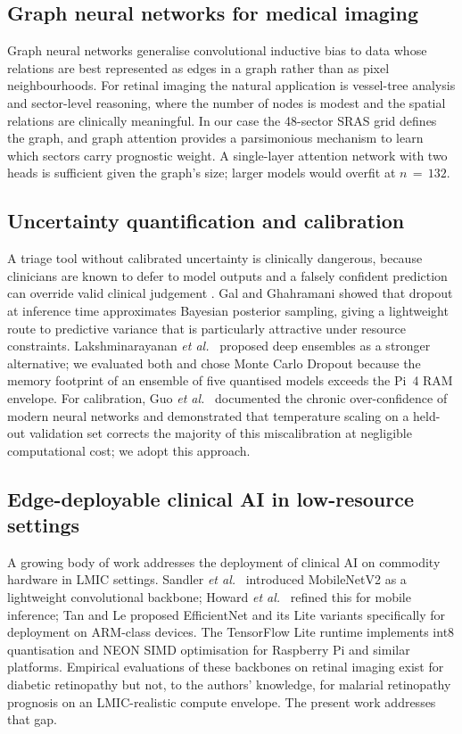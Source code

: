 \documentclass[twocolumn,10pt]{article}
\begin{document}
\subsection{Graph neural networks for medical imaging}
Graph neural networks \cite{Velickovic2018,Kipf2017GCN}
generalise convolutional inductive bias to data whose relations
are best represented as edges in a graph rather than as pixel
neighbourhoods. For retinal imaging the natural application is
vessel-tree analysis and sector-level reasoning, where the number
of nodes is modest and the spatial relations are clinically
meaningful. In our case the 48-sector SRAS grid defines the graph,
and graph attention \cite{Velickovic2018} provides a parsimonious
mechanism to learn which sectors carry prognostic weight. A
single-layer attention network with two heads is sufficient given
the graph's size; larger models would overfit at
$n\,=\,132$.

\subsection{Uncertainty quantification and calibration}
A triage tool without calibrated uncertainty is clinically
dangerous, because clinicians are known to defer to model outputs
and a falsely confident prediction can override valid clinical
judgement \cite{CabitzaRasoini2017}. Gal and Ghahramani
\cite{Gal2016} showed that dropout at inference time approximates
Bayesian posterior sampling, giving a lightweight route to
predictive variance that is particularly attractive under
resource constraints. Lakshminarayanan \emph{et al.}\
\cite{Lakshminarayanan2017DeepEnsembles} proposed deep ensembles
as a stronger alternative; we evaluated both and chose Monte Carlo
Dropout because the memory footprint of an ensemble of five
quantised models exceeds the Pi~4 RAM envelope. For calibration,
Guo \emph{et al.}\ \cite{Guo2017Calibration} documented the
chronic over-confidence of modern neural networks and demonstrated
that temperature scaling on a held-out validation set corrects the
majority of this miscalibration at negligible computational cost;
we adopt this approach.

\subsection{Edge-deployable clinical AI in low-resource settings}
A growing body of work addresses the deployment of clinical AI on
commodity hardware in LMIC settings. Sandler \emph{et al.}\
\cite{Sandler2018} introduced MobileNetV2 as a lightweight
convolutional backbone; Howard \emph{et al.}\
\cite{Howard2019MobileNetV3} refined this for mobile inference;
Tan and Le \cite{Tan2019} proposed EfficientNet and its Lite
variants specifically for deployment on ARM-class devices. The
TensorFlow Lite runtime \cite{TFLite2022} implements int8
quantisation and NEON SIMD optimisation for Raspberry Pi and
similar platforms. Empirical evaluations of these backbones on
retinal imaging exist for diabetic retinopathy \cite{Sahlsten2019}
but not, to the authors' knowledge, for malarial retinopathy
prognosis on an LMIC-realistic compute envelope. The present work
addresses that gap.
\end{document}

